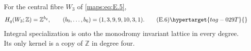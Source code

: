 
\begin{theorem}\hypertarget{tag-02M6}{}\label{maps:src:E.1.3}


For the central fibre $W_3$ of \eqref{maps:eq:E.5},
\[
 H_q(W_3;\mathbb Z)=\mathbb Z^{b_q},\qquad
 (b_0,\ldots,b_6)=(1,3,9,9,10,3,1).
 \tag{E.6}\hypertarget{tag-029T}{}\label{maps:eq:E.6}
\]
Integral specialization is onto the monodromy invariant lattice in
every degree.  Its only kernel is a copy of $\mathbb Z$ in degree four.

\end{theorem}


